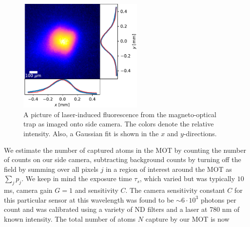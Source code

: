 \begin{figure}
    \centering
    \includegraphics[width=0.55\textwidth]{figures/FluoresenceAndFits.pdf}
    \caption{A picture of laser-induced fluorescence from the magneto-optical trap as imaged onto side camera. 
    The colors denote the relative intensity.
    Also, a Gaussian fit is shown in the $x$ and $y$-directions.}
    \label{fig:LiF}
\end{figure}

   
We estimate the number of captured atoms in the MOT by counting the number of counts on our side camera, subtracting background counts by turning off the field by summing over all pixels $j$ in a region of interest around the MOT as $\sum_j p_j$.
We keep in mind the exposure time $\tau_s$, which varied but was typically $10$ ms, camera gain $G = 1$ and sensitivity $C$.
The camera sensitivity constant $C$ for this particular sensor at this wavelength was found to be $\sim 6 \cdot 10^3$ photons per count and was calibrated using a variety of ND filters and a laser at 780 nm of known intensity. The total number of atoms $N$ capture by our MOT is now
 

